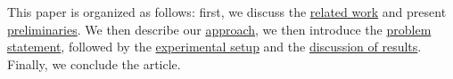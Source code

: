 This paper is organized as follows: first, we discuss the \hyperref[sec:related_work]{related work} and present \hyperref[sec:preliminaries]{preliminaries}.
We then describe our \hyperref[sec:approach]{approach}, we then introduce the \hyperref[sec:problem_statement]{problem statement}, followed by the \hyperref[sec:experiment]{experimental setup} and the \hyperref[sec:result]{discussion of results}.
Finally, we conclude the article.

